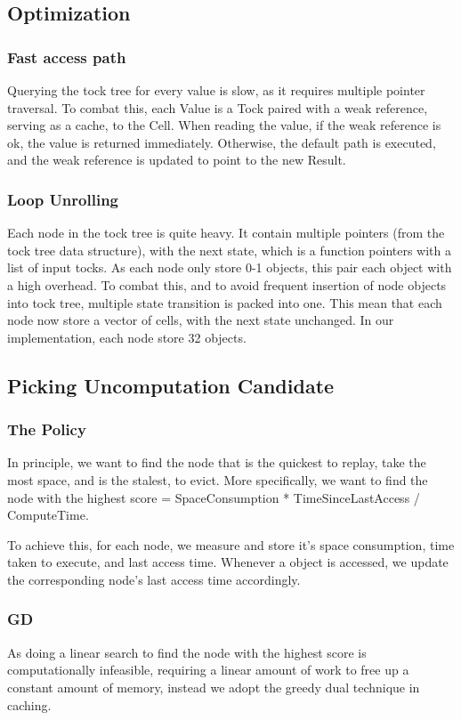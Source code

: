 \subsection{Optimization}
\subsubsection{Fast access path}
Querying the tock tree for every value is slow, as it requires multiple pointer traversal.
To combat this, each Value is a Tock paired with a weak reference, serving as a cache, to the Cell. When reading the value, if the weak reference is ok, the value is returned immediately. Otherwise, the default path is executed, and the weak reference is updated to point to the new Result.
\subsubsection{Loop Unrolling}
Each node in the tock tree is quite heavy. It contain multiple pointers (from the tock tree data structure), with the next state, which is a function pointers with a list of input tocks. As each node only store 0-1 objects, this pair each object with a high overhead. To combat this, and to avoid frequent insertion of node objects into tock tree, multiple state transition is packed into one. This mean that each node now store a vector of cells, with the next state unchanged. In our implementation, each node store 32 objects.
\subsection{Picking Uncomputation Candidate}
\subsubsection{The Policy}
In principle, we want to find the node that is the quickest to replay, take the most space, and is the stalest, to evict. More specifically, we want to find the node with the highest score = SpaceConsumption * TimeSinceLastAccess / ComputeTime.

To achieve this, for each node, we measure and store it's space consumption, time taken to execute, and last access time. Whenever a object is accessed, we update the corresponding node's last access time accordingly.
\subsubsection{GD}
As doing a linear search to find the node with the highest score is computationally infeasible, requiring a linear amount of work to free up a constant amount of memory, instead we adopt the greedy dual technique in caching.

